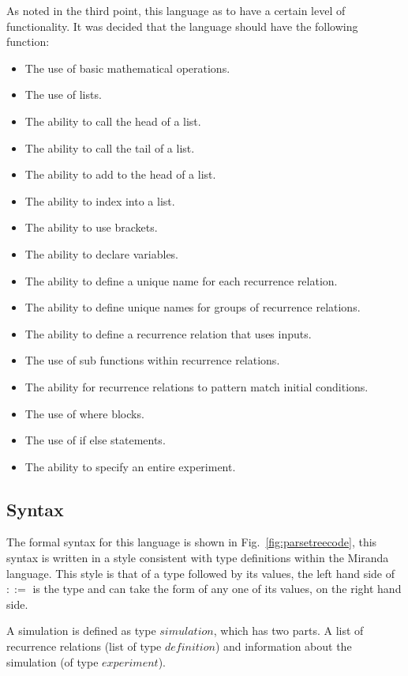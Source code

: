 \documentclass{article}
\begin{document}
As noted in the third point, this language as to have a certain level of functionality. It was decided that the language should have the following function:
\begin{itemize}
  \item The use of basic mathematical operations.%
  \item The use of lists.%
  \item The ability to call the head of a list.%
  \item The ability to call the tail of a list.%
  \item The ability to add to the head of a list.%
  \item The ability to index into a list.%
  \item The ability to use brackets.%
  \item The ability to declare variables.  
  \item The ability to define a unique name for each recurrence relation.
  \item The ability to define unique names for groups of recurrence relations. 
  \item The ability to define a recurrence relation that uses inputs.
  \item The use of sub functions within recurrence relations. 
  \item The ability for recurrence relations to pattern match initial conditions.  
  \item The use of where blocks.%
  \item The use of if else statements.%
  \item The ability to specify an entire experiment.  
\end{itemize}



\subsection{Syntax}
The formal syntax for this language is shown in Fig.~\ref{fig:parsetreecode}, this syntax is written in a style consistent with type definitions within the Miranda language. This style is that of a type followed by its values, the left hand side of $::=$ is the type and can take the form of any one of its values, on the right hand side. 

A simulation is defined as type $simulation$, which has two parts. A list of recurrence relations (list of type $definition$) and information about the simulation (of type $experiment$). 
\end{document}
